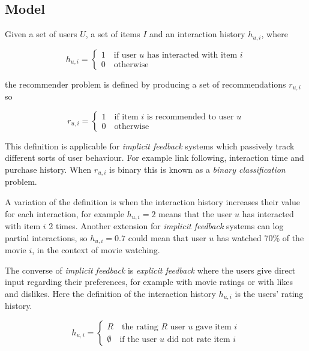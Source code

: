 
\subsection{Model}\label{sec:background:theory:model}


Given a set of users $U$, a set of items $I$ and an interaction history $h_{u, i}$,  where

\begin{equation}\label{eq:hist}
    h_{u, i} = \begin{cases}
        1 \quad \text{if user $u$ has interacted with item $i$} \\
        0 \quad \text{otherwise}
    \end{cases}
\end{equation}

the recommender problem is defined by producing a set of recommendations $r_{u, i}$ so

\begin{equation}
    r_{u, i} = \begin{cases}
        1 \quad \text{if item $i$ is recommended to user $u$} \\
        0 \quad \text{otherwise}
    \end{cases}
\end{equation}

This definition is applicable for \textit{implicit feedback} systems which passively track different sorts of user behaviour. For example link following, interaction time and purchase history. When $r_{u, i}$ is binary this is known as a \textit{binary classification} problem.

A variation of the definition is when the interaction history increases their value for each interaction, for example $h_{u, i} = 2$ means that the user $u$ has interacted with item $i$ 2 times. Another extension for \textit{implicit feedback} systems can log partial interactions, so $h_{u, i} = 0.7$ could mean that user $u$ has watched 70\% of the movie $i$, in the context of movie watching. \citep{hu2008collaborative}

The converse of \textit{implicit feedback} is \textit{explicit feedback} where the users give direct input regarding their preferences, for example with movie ratings or with likes and dislikes.  Here the definition of the interaction history $h_{u, i}$ is the users' rating history.

\begin{equation}
    h_{u, i} = \begin{cases}
        R \quad \text{the rating $R$ user $u$ gave item $i$} \\
        \emptyset \quad \text{if the user $u$ did not rate item $i$}
    \end{cases}
\end{equation}

